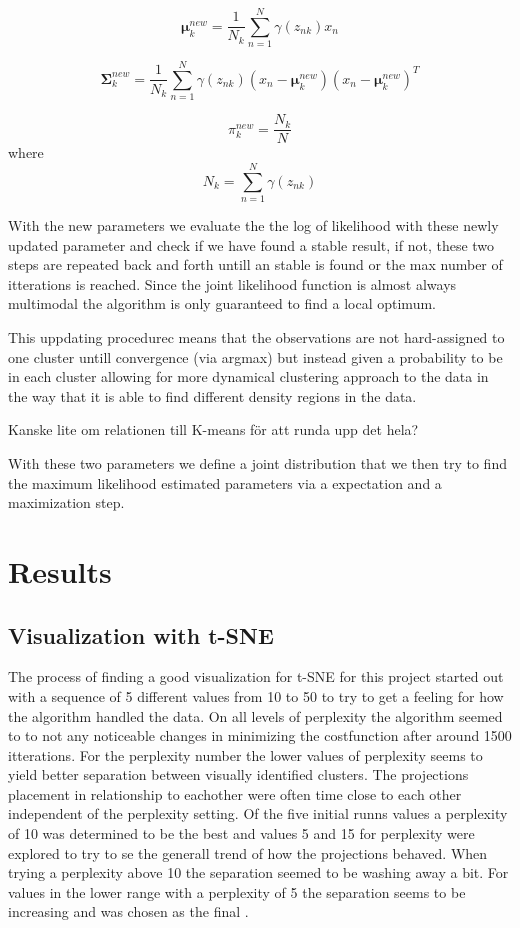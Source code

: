 \documentclass{article}
\begin{document}
$$\mathbf{\mu}_k^{new} = \frac{1}{N_k} \sum_{n=1}^N\gamma(z_{nk})x_n$$

$$\mathbf{\Sigma}_k^{new} = \frac{1}{N_k} \sum_{n=1}^N\gamma(z_{nk})(x_n-\mathbf{\mu}_k^{new})(x_n-\mathbf{\mu}_k^{new})^T$$

$$ \pi_k^{new}= \frac{N_k}{N} $$ 
where
$$  N_k = \sum_{n=1}^N \gamma(z_{nk})$$

With the new parameters we evaluate the the log of likelihood with these newly updated parameter and check if we have found a stable result, if not, these two steps are  repeated back and forth untill an stable is found or the max number of itterations is reached. Since the joint likelihood function is almost always multimodal the algorithm is only guaranteed to find a local optimum. 

This uppdating procedurec means that the observations are not hard-assigned to one cluster untill convergence (via argmax) but instead given a probability to be in each cluster allowing for more dynamical clustering approach to the data in the way that it is able to find different density regions in the data. 

Kanske lite om relationen till K-means för att runda upp det hela? 


With these two parameters we define a joint distribution that we then try to find the maximum likelihood estimated parameters via a expectation and a maximization step.

\newpage

\section{Results}

\subsection{Visualization with t-SNE}

The process of finding a good visualization for t-SNE for this project started out with a sequence of 5 different values from 10 to 50 to try to get a feeling for how the algorithm handled the data. On all levels of perplexity the algorithm seemed to to not any noticeable changes in minimizing the costfunction after around 1500 itterations. For the perplexity number the lower values of perplexity seems to yield better separation between visually identified clusters. The projections placement in relationship to eachother were often time close to each other independent of the perplexity setting. Of the five initial runns values a perplexity of 10 was determined to be the best and values 5 and 15 for perplexity were explored to try to se the generall trend of how the projections behaved. When trying a perplexity above 10 the separation seemed to be washing away a bit. For values in the lower range with a perplexity of 5 the separation seems to be increasing and was chosen as the final . 
\end{document}
